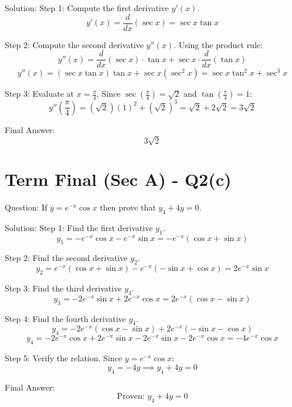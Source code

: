 \documentclass[11pt, a4paper]{article}
\begin{document}
Solution:
Step 1: Compute the first derivative $y'(x)$.
$$y'(x) = \frac{d}{dx}(\sec x) = \sec x \tan x$$

Step 2: Compute the second derivative $y''(x)$.
Using the product rule:
$$y''(x) = \frac{d}{dx}(\sec x) \cdot \tan x + \sec x \cdot \frac{d}{dx}(\tan x)$$
$$y''(x) = (\sec x \tan x) \tan x + \sec x (\sec^2 x) = \sec x \tan^2 x + \sec^3 x$$

Step 3: Evaluate at $x = \frac{\pi}{4}$.
Since $\sec\left(\frac{\pi}{4}\right) = \sqrt{2}$ and $\tan\left(\frac{\pi}{4}\right) = 1$:
$$y''\left(\frac{\pi}{4}\right) = (\sqrt{2})(1)^2 + (\sqrt{2})^3 = \sqrt{2} + 2\sqrt{2} = 3\sqrt{2}$$

Final Answer:
$$
\boxed{3\sqrt{2}}
$$


\section*{Term Final (Sec A) - Q2(c)}
Question:
If $y = e^{-x} \cos x$ then prove that $y_4 + 4y = 0$.

Solution:
Step 1: Find the first derivative $y_1$.
$$y_1 = -e^{-x} \cos x - e^{-x} \sin x = -e^{-x}(\cos x + \sin x)$$

Step 2: Find the second derivative $y_2$.
$$y_2 = e^{-x}(\cos x + \sin x) - e^{-x}(-\sin x + \cos x) = 2e^{-x} \sin x$$

Step 3: Find the third derivative $y_3$.
$$y_3 = -2e^{-x} \sin x + 2e^{-x} \cos x = 2e^{-x}(\cos x - \sin x)$$

Step 4: Find the fourth derivative $y_4$.
$$y_4 = -2e^{-x}(\cos x - \sin x) + 2e^{-x}(-\sin x - \cos x)$$
$$y_4 = -2e^{-x}\cos x + 2e^{-x}\sin x - 2e^{-x}\sin x - 2e^{-x}\cos x = -4e^{-x}\cos x$$

Step 5: Verify the relation.
Since $y = e^{-x} \cos x$:
$$y_4 = -4y \implies y_4 + 4y = 0$$

Final Answer:
$$
\boxed{\text{Proven: } y_4 + 4y = 0}
$$

\end{document}
